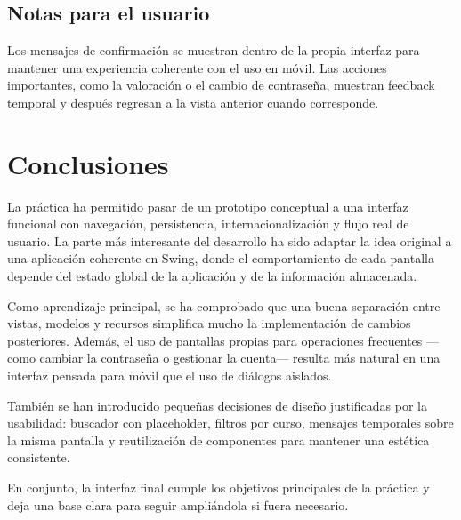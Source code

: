 \documentclass[12pt,oneside]{book}
\begin{document}
\subsection{Notas para el usuario}

Los mensajes de confirmación se muestran dentro de la propia interfaz para mantener una experiencia coherente con el uso en móvil. Las acciones importantes, como la valoración o el cambio de contraseña, muestran feedback temporal y después regresan a la vista anterior cuando corresponde.

\newpage
\section{Conclusiones}

La práctica ha permitido pasar de un prototipo conceptual a una interfaz funcional con navegación, persistencia, internacionalización y flujo real de usuario. La parte más interesante del desarrollo ha sido adaptar la idea original a una aplicación coherente en Swing, donde el comportamiento de cada pantalla depende del estado global de la aplicación y de la información almacenada.

Como aprendizaje principal, se ha comprobado que una buena separación entre vistas, modelos y recursos simplifica mucho la implementación de cambios posteriores. Además, el uso de pantallas propias para operaciones frecuentes —como cambiar la contraseña o gestionar la cuenta— resulta más natural en una interfaz pensada para móvil que el uso de diálogos aislados.

También se han introducido pequeñas decisiones de diseño justificadas por la usabilidad: buscador con placeholder, filtros por curso, mensajes temporales sobre la misma pantalla y reutilización de componentes para mantener una estética consistente.

En conjunto, la interfaz final cumple los objetivos principales de la práctica y deja una base clara para seguir ampliándola si fuera necesario.
\end{document}
